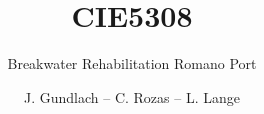 \documentclass[whitelogo]{tudelft-report}
\begin{document}
\frontmatter


\title[tudelft-white]{CIE5308}
\subtitle[tudelft-black]{Breakwater Rehabilitation Romano Port}
\author[tudelft-white]{{J. Gundlach} -- {C. Rozas} -- {L. Lange}}
\makecover[split]




% 

\tableofcontents

\mainmatter

%









\appendix




\end{document}
